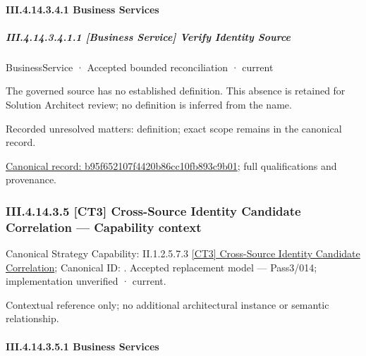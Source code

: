 \paragraph*{III.4.14.3.4.1 Business Services}
\label{navigation:III.4.14.3.4.1}

\subparagraph*{III.4.14.3.4.1.1 [Business Service] Verify Identity Source}
\label{navigation:III.4.14.3.4.1.1}

\label{element:b95f652107f4420b86cc10fb893c9b01}
{\small BusinessService · Accepted bounded reconciliation · current}\par

The governed source has no established definition. This absence is retained for Solution Architect review; no definition is inferred from the name.


{\small Recorded unresolved matters: definition; exact scope remains in the canonical record.}\par
{\footnotesize \href{../../../../../../../../continuum/business/business-service/b95f652107f4420b86cc10fb893c9b01.md}{Canonical record: b95f652107f4420b86cc10fb893c9b01}; full qualifications and provenance.}\par
\subsubsection*{III.4.14.3.5 [CT3] Cross-Source Identity Candidate Correlation — Capability context}
\label{navigation:III.4.14.3.5}

{\small Canonical Strategy Capability: II.1.2.5.7.3 \hyperref[element:60d97cd46fde4349864aa737526f08cb]{[CT3] Cross-Source Identity Candidate Correlation}; Canonical ID: \texttt{}. Accepted replacement model — Pass3/014; implementation unverified · current.}\par
Contextual reference only; no additional architectural instance or semantic relationship.\par
\paragraph*{III.4.14.3.5.1 Business Services}
\label{navigation:III.4.14.3.5.1}

